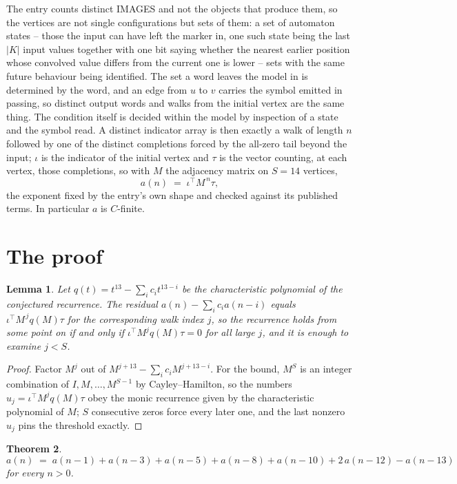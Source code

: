 \documentclass[11pt,a4paper]{article}
\theoremstyle{plain}
\newtheorem{theorem}{Theorem}
\newtheorem{lemma}[theorem]{Lemma}
\theoremstyle{definition}
\begin{document}
The entry counts distinct IMAGES and not the objects that produce them, so the vertices are not single configurations but sets of them: a set of automaton states -- those the input can have left the marker in, one such state being the last $|K|$ input values together with one bit saying whether the nearest earlier position whose convolved value differs from the current one is lower -- sets with the same future behaviour being identified. The set a word leaves the model in is determined by the word, and an edge from $u$ to $v$ carries the symbol emitted in passing, so distinct output words and walks from the initial vertex are the same thing. The condition itself is decided within the model by inspection of a state and the symbol read.
A distinct indicator array is then exactly a walk of length $n$ followed by one of the distinct completions forced by the all-zero tail beyond the input; $\iota$ is the indicator of the initial vertex and $\tau$ is the vector counting, at each vertex, those completions, so with $M$ the adjacency matrix on $S=14$ vertices,
\[
a(n)\;=\;\iota^{\!\top}M^{\,n}\tau ,
\]
the exponent fixed by the entry's own shape and checked against its published terms. In
particular $a$ is $C$-finite.

\section{The proof}

\begin{lemma}\label{lem:crit}
Let $q(t)=t^{13}-\sum_i c_it^{13-i}$ be the characteristic polynomial of the
conjectured recurrence. The residual $a(n)-\sum_ic_ia(n-i)$ equals
$\iota^{\!\top}M^{\,j}q(M)\tau$ for the corresponding walk index $j$, so the recurrence
holds from some point on if and only if $\iota^{\!\top}M^{j}q(M)\tau=0$ for all large $j$,
and it is enough to examine $j<S$.
\end{lemma}

\begin{proof}
Factor $M^{j}$ out of $M^{j+13}-\sum_ic_iM^{j+13-i}$. For the bound, $M^{S}$
is an integer combination of $I,M,\dots,M^{S-1}$ by Cayley--Hamilton, so the numbers
$u_j=\iota^{\!\top}M^{j}q(M)\tau$ obey the monic recurrence given by the characteristic
polynomial of $M$; $S$ consecutive zeros force every later one, and the last nonzero $u_j$
pins the threshold exactly.
\end{proof}

\begin{theorem}
\[
a(n)\;=\;a(n-1) + a(n-3) + a(n-5) + a(n-8) + a(n-10) + 2\,a(n-12) - a(n-13)
\]
for every $n>0$.
\end{theorem}
\end{document}
